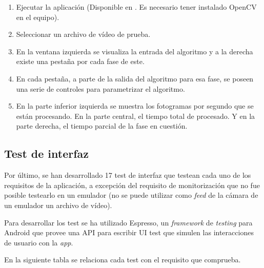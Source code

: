 \begin{enumerate}
\def\labelenumi{\arabic{enumi}.}
\tightlist
\item
  Ejecutar la aplicación (Disponible en \citep{github:extraapps}. Es
  necesario tener instalado OpenCV en el equipo).
\item
  Seleccionar un archivo de vídeo de prueba.
\item
  En la ventana izquierda se visualiza la entrada del algoritmo y a la
  derecha existe una pestaña por cada fase de este.
\item
  En cada pestaña, a parte de la salida del algoritmo para esa fase, se
  poseen una serie de controles para parametrizar el algoritmo.
\item
  En la parte inferior izquierda se muestra los fotogramas por segundo
  que se están procesando. En la parte central, el tiempo total de
  procesado. Y en la parte derecha, el tiempo parcial de la fase en
  cuestión.
\end{enumerate}


\subsection{Test de interfaz}\label{test-de-interfaz}

Por último, se han desarrollado 17 test de interfaz que testean cada uno
de los requisitos de la aplicación, a excepción del requisito de
monitorización que no fue posible testearlo en un emulador (no se puede
utilizar como \emph{feed} de la cámara de un emulador un archivo de
vídeo).

Para desarrollar los test se ha utilizado Espresso, un \emph{framework}
de \emph{testing} para Android que provee una API para escribir UI test
que simulen las interacciones de usuario con la \emph{app}.

En la siguiente tabla se relaciona cada test con el requisito que
comprueba.

